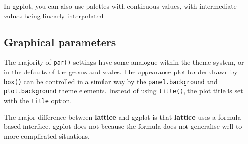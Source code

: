 In ggplot, you can also use palettes with continuous values, with
intermediate values being linearly interpolated.

\begin{Shaded}
\begin{Highlighting}[]
\NormalTok{(}\NormalTok{:}\NormalTok{, }\NormalTok{:}\NormalTok{, } \NormalTok{:}\NormalTok{, } \NormalTok{(}\NormalTok{)) +}
\StringTok{  }\NormalTok{(} \NormalTok{(}\NormalTok{))}
\NormalTok{() +}
\StringTok{  }\NormalTok{(} \NormalTok{(}\NormalTok{))}
\end{Highlighting}
\end{Shaded}

\subsection{Graphical parameters}

The majority of \texttt{par()} settings have some analogue within the
theme system, or in the defaults of the geoms and scales. The appearance
plot border drawn by \texttt{box()} can be controlled in a similar way
by the \texttt{panel.background} and \texttt{plot.background} theme
elements. Instead of using \texttt{title()}, the plot title is set with
the \texttt{title} option.


The major difference between \textbf{lattice} and ggplot is that
\textbf{lattice} uses a formula-based interface. ggplot does not because
the formula does not generalise well to more complicated situations.

\begin{Shaded}
\begin{Highlighting}[]
\StringTok{ } 
 

\StringTok{ }\StringTok{ }\StringTok{ } 
  \NormalTok{~}\StringTok{ }\StringTok{ }
  \StringTok{ }
\end{Highlighting}
\end{Shaded}

